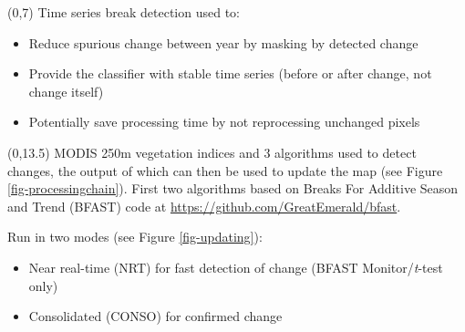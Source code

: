\documentclass[20pt]{beamer}
\begin{document}
\begin{frame}{}
	\begin{textblock}{7}(0,7)
	  \Line
        Time series break detection used to:
        \begin{itemize}
         \item Reduce spurious change between year by masking by detected change
         \item Provide the classifier with stable time series (before or after change, not change itself)
         \item Potentially save processing time by not reprocessing unchanged pixels
        \end{itemize}
        

	\end{textblock}
	
	\begin{textblock}{7}(0,13.5)
	  \Line 
        MODIS 250m vegetation indices and 3 algorithms used to detect changes, the output of which can then be used to update the map (see Figure \ref{fig-processingchain}). First two algorithms based on Breaks For Additive Season and Trend (BFAST) code at \url{https://github.com/GreatEmerald/bfast}.
        
        Run in two modes (see Figure \ref{fig-updating}):
        \begin{itemize}
         \item Near real-time (NRT) for fast detection of change (BFAST Monitor/\textit{t}-test only)
         \item Consolidated (CONSO) for confirmed change
        \end{itemize}
        

\end{textblock}
\end{frame}
\end{document}
